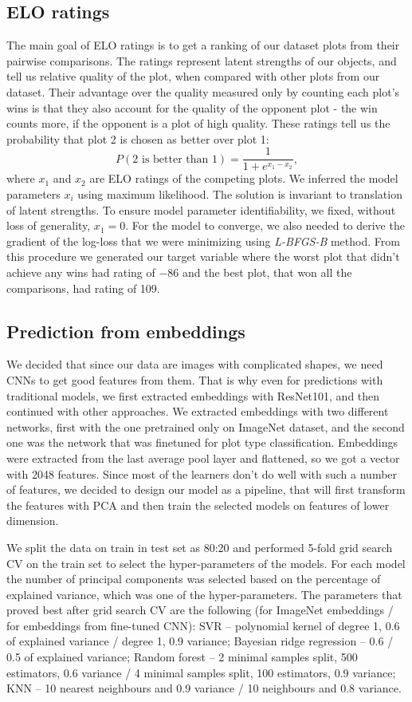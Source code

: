 \documentclass[fleqn,moreauthors,10pt]{ds_report}
\begin{document}
\subsection*{ELO ratings}
The main goal of ELO ratings is to get a ranking of our dataset plots from their pairwise comparisons. The ratings represent latent strengths of our objects, and tell us relative quality of the plot, when compared with other plots from our dataset. Their advantage over the quality measured only by counting each plot's wins is that they also account for the quality of the opponent plot - the win counts more, if the opponent is a plot of high quality.
These ratings tell us the probability that plot 2 is chosen as better over plot 1:
$$ P(2\text{ is better than }1) = \dfrac{1}{1 + e^{x_1 - x_2}}, $$
where $x_1$ and $x_2$ are ELO ratings of the competing plots.
We inferred the model parameters $x_i$ using maximum likelihood. The solution is invariant to translation of latent strengths. To ensure model parameter identifiability, we fixed, without loss of generality, $x_1 = 0$. For the model to converge, we also needed to derive the gradient of the log-loss that we were minimizing using \emph{L-BFGS-B} method.
From this procedure we generated our target variable where the worst plot that didn't achieve any wins had rating of $-86$ and the best plot, that won all the comparisons, had rating of 109.

\subsection*{Prediction from embeddings}
We decided that since our data are images with complicated shapes, we need CNNs to get good features from them. That is why even for predictions with traditional models, we first extracted embeddings with ResNet101, and then continued with other approaches. We extracted embeddings with two different networks, first with the one pretrained only on ImageNet dataset, and the second one was the network that was finetuned for plot type classification.
Embeddings were extracted from the last average pool layer and flattened, so we got a vector with 2048 features.
Since most of the learners don't do well with such a number of features, we decided to design our model as a pipeline, that will first transform the features with PCA and then train the selected models on features of lower dimension.

We split the data on train in test set as 80:20 and performed 5-fold grid search CV on the train set to select the hyper-parameters of the models.
For each model the number of principal components was selected based on the percentage of explained variance, which was one of the hyper-parameters.
The parameters that proved best after grid search CV are the following (for ImageNet embeddings / for embeddings from fine-tuned CNN):
SVR -- polynomial kernel of degree 1, 0.6 of explained variance / degree 1, 0.9 variance; Bayesian ridge regression -- 0.6 / 0.5 of explained variance; Random forest -- 2 minimal samples split, 500 estimators, 0.6 variance / 4 minimal samples split, 100 estimators, 0.9 variance; KNN -- 10 nearest neighbours and 0.9 variance / 10 neighbours and 0.8 variance.
\end{document}
